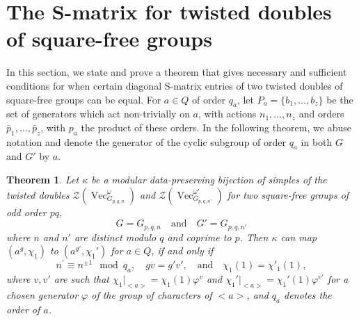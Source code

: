 \documentclass[a4paper, 10pt]{book}
\newtheorem{theorem}{Theorem}[chapter]
\theoremstyle{definition}
\numberwithin{equation}{chapter}
\newcommand\Vect{\operatorname{Vec}}
\newcommand\CTR{\mathcal Z}
\newcommand{\pb}{\bar{p}}
\newcommand{\qb}{q_a}
\begin{document}
\section{The S-matrix for twisted doubles of square-free groups} \label{squarefreeS}
In this section, we state and prove a theorem that gives necessary and sufficient conditions for when certain diagonal S-matrix entries of two twisted doubles of square-free groups can be equal. For $a\in Q$ of order $q_a$, let $P_a = \{b_1,\dots,b_z\}$  be the set of generators which act non-trivially on $a$, with actions $n_1,\dots, n_z$ and orders $\pb_1,..., \pb_z$, with $p_a$ the product of these orders. In the following theorem, we abuse notation and denote the generator of the cyclic subgroup of order $q_a$ in both $G$ and $G'$ by $a$. 
\begin{theorem}
Let $\kappa$ be a modular data-preserving bijection of simples of the twisted doubles $\CTR(\Vect_{G_{p,q,n}}^\omega)$ and $\CTR(\Vect_{G_{p,q,n'}}^{\omega'})$ for two square-free groups of odd order $pq$, \begin{equation*}
	G = G_{p,q,n} \quad \text{and} \quad G'=G_{p,q,n'}
\end{equation*} where $n$ and $n'$ are distinct modulo $q$ and coprime to $p$.  Then $\kappa$ can map $(a^g, \chi_1)$ to $(a^{g'}, \chi_1')$ for $a \in Q$,  if and only if \begin{equation*}
	n^{\prime} \equiv  n^{\pm 1} \mod \qb, \quad gv = g'v', \quad  \text{and}\quad \chi_1(1)=\chi'_1(1),
\end{equation*}
where $v,v'$ are such that $\chi_1|_{<a>} = \chi_1(1)\varphi^v$ and $\chi_1'|_{<a>}= \chi_1'(1)\varphi^{v'}$ for a chosen generator $\varphi$ of the group of characters of $<a>$, and $q_a$ denotes the order of $a$.
\end{theorem}
\end{document}
